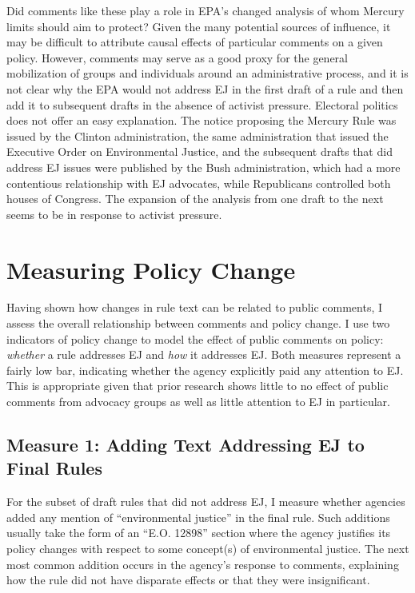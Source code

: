 \documentclass[
      12pt,
        ]{article}
\begin{document}
Did comments like these play a role in EPA's changed analysis of
whom Mercury limits should aim to protect?
Given the many potential sources of influence, it may be difficult to
attribute causal effects of particular comments on a given policy.
However, comments may serve as a good proxy for the general mobilization
of groups and individuals around an administrative process, and it is
not clear why the EPA would not address EJ in the first
draft of a rule and then add it to subsequent drafts in the absence of
activist pressure. Electoral politics does not offer an easy
explanation. The notice proposing the Mercury Rule was issued by the
Clinton administration, the same administration that issued the
Executive Order on Environmental Justice, and the subsequent drafts that
did address EJ issues were published by the Bush
administration, which had a more contentious relationship with
EJ advocates, while Republicans controlled both
houses of Congress. The expansion of the analysis from one draft to the
next seems to be in response to activist pressure.

\hypertarget{measuring-policy-change}{%
\section{Measuring Policy Change}\label{measuring-policy-change}}

Having shown how changes in rule text can be related to public comments, I assess the overall relationship between comments and policy change. I use two indicators of policy change to model the effect of public comments on policy: \emph{whether} a rule addresses EJ and \emph{how} it addresses EJ. Both measures represent a fairly low bar, indicating whether the agency explicitly paid any attention to EJ. This is appropriate given that prior research shows little to no effect of public comments from advocacy groups as well as little attention to EJ in particular.

\hypertarget{measure-1-adding-text-addressing-ej-to-final-rules}{%
\subsection{Measure 1: Adding Text Addressing EJ to Final Rules}\label{measure-1-adding-text-addressing-ej-to-final-rules}}

For the subset of draft rules that did not address EJ, I measure whether agencies added any mention of ``environmental justice'' in the final rule. Such additions usually take the form of an ``E.O. 12898'' section where the agency justifies its policy changes with respect to some concept(s) of environmental justice. The next most common addition occurs in the agency's response to comments, explaining how the rule did not have disparate effects or that they were insignificant.
\end{document}
